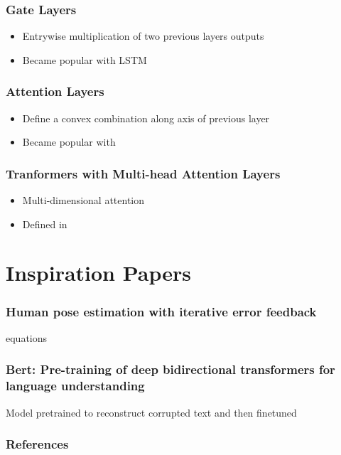 \documentclass{beamer}
\begin{document}
\frame
{
   \frametitle{Gate Layers}

   \begin{itemize}
      \item<1-> Entrywise multiplication of two previous layers outputs

      \item<2-> Became popular with LSTM
      
   \end{itemize}
}

\frame
{
   \frametitle{Attention Layers}

   \begin{itemize}
      \item<1-> Define a convex combination along axis of previous layer

      \item<2-> Became popular with
      
   \end{itemize}
}

\frame
{
   \frametitle{Tranformers with Multi-head Attention Layers}

   \begin{itemize}
      \item<1-> Multi-dimensional attention

      \item<2-> Defined in
      
   \end{itemize}
}

\section{Inspiration Papers}

\frame
{
   \frametitle{Human pose estimation with iterative error feedback\cite{carreira2016human}}

   equations
}


\frame
{
   \frametitle{Bert: Pre-training of deep bidirectional transformers for language understanding\cite{devlin2018bert}}

   Model pretrained to reconstruct corrupted text and then finetuned
}



\begin{frame}[t,allowframebreaks]
\frametitle{References}
\printbibliography
\end{frame}
\end{document}
